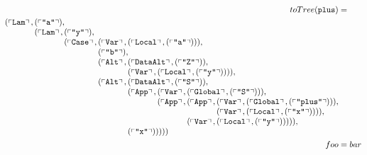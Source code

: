 \begin{figure}
  \begin{small}
  \begin{align*}
    toTree(\hs{plus}) &= \\
      (\feature{\CLam},
       \begin{array}[t]{@{}l@{}}
         (\feature{\id{a}}), \\
         (\feature{\CLam},
          \begin{array}[t]{@{}l@{}}
            (\feature{\id{y}}), \\
            (\feature{\CCase},
             \begin{array}[t]{@{}l@{}}
               (\feature{\CVar}, (\feature{\CLocal}, (\feature{\id{a}}))), \\
               (\feature{\id{b}}), \\
               (\feature{\CAlt},
                \begin{array}[t]{@{}l@{}}
                  (\feature{\CDataAlt}, (\feature{\id{Z}})), \\
                  (\feature{\CVar}, (\feature{\CLocal}, (\feature{\id{y}})))),
                \end{array} \\
               (\feature{\CAlt},
                \begin{array}[t]{@{}l@{}}
                  (\feature{\CDataAlt}, (\feature{\id{S}})), \\
                  (\feature{\CApp},
                   \begin{array}[t]{@{}l@{}}
                     (\feature{\CVar}, (\feature{\CGlobal}, (\feature{\id{S}}))), \\
                     (\feature{\CApp},
                      \begin{array}[t]{@{}l@{}}
                        (\feature{\CApp},
                         \begin{array}[t]{@{}l@{}}
                           (\feature{\CVar}, (\feature{\CGlobal}, (\feature{\id{plus}}))), \\
                           (\feature{\CVar}, (\feature{\CLocal}, (\feature{\id{x}})))),
                         \end{array} \\
                      (\feature{\CVar}, (\feature{\CLocal}, (\feature{\id{y}}))))),
                      \end{array}
                   \end{array} \\
                  (\feature{\id{x}})))))
                \end{array}
             \end{array}
          \end{array}
       \end{array} \\
foo &= bar
  \end{align*}
  \end{small}
  \caption{}
  \label{fig:rosetreeexample}
\end{figure}

